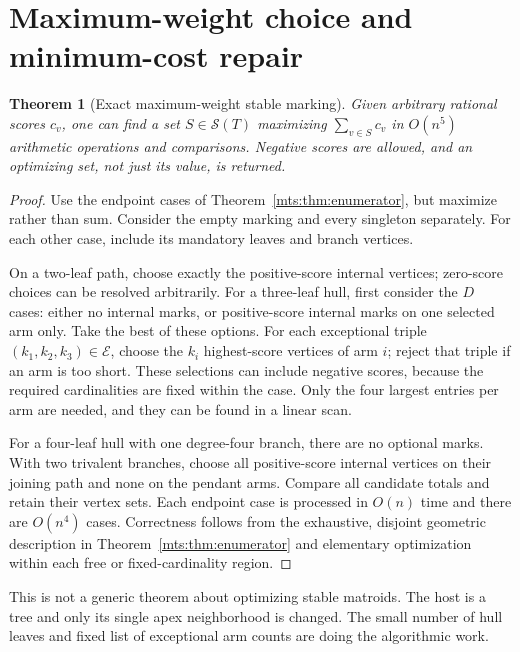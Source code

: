 \documentclass[11pt]{article}
\numberwithin{equation}{section}
\newtheorem{theorem}{Theorem}[section]
\theoremstyle{definition}
\newcommand{\Stab}{\mathcal S}
\begin{document}
\section{Maximum-weight choice and minimum-cost repair}\label{mts:sec:optimization}

\begin{theorem}[Exact maximum-weight stable marking]\label{mts:thm:optimization}
Given arbitrary rational scores $c_v$, one can find a set $S\in\Stab(T)$
maximizing $\sum_{v\in S}c_v$ in $O(n^5)$ arithmetic operations and
comparisons. Negative scores are allowed, and an optimizing set, not just
its value, is returned.
\end{theorem}
\begin{proof}
Use the endpoint cases of Theorem~\ref{mts:thm:enumerator}, but maximize rather than
sum. Consider the empty marking and every singleton separately. For each
other case, include its mandatory leaves and branch vertices.

On a two-leaf path, choose exactly the positive-score internal vertices;
zero-score choices can be resolved arbitrarily. For a three-leaf hull,
first consider the $D$ cases: either no internal marks, or positive-score
internal marks on one selected arm only. Take the best of these options.
For each exceptional triple $(k_1,k_2,k_3)\in\mathcal E$, choose the $k_i$
highest-score vertices of arm $i$; reject that triple if an arm is too
short. These selections can include negative scores, because the required
cardinalities are fixed within the case. Only the four largest entries
per arm are needed, and they can be found in a linear scan.

For a four-leaf hull with one degree-four branch, there are no optional
marks. With two trivalent branches, choose all positive-score internal
vertices on their joining path and none on the pendant arms. Compare all
candidate totals and retain their vertex sets. Each endpoint case is
processed in $O(n)$ time and there are $O(n^4)$ cases. Correctness follows
from the exhaustive, disjoint geometric description in
Theorem~\ref{mts:thm:enumerator} and elementary optimization within each free or
fixed-cardinality region.
\end{proof}

This is not a generic theorem about optimizing stable matroids. The host
is a tree and only its single apex neighborhood is changed. The small
number of hull leaves and fixed list of exceptional arm counts are doing
the algorithmic work.
\end{document}

